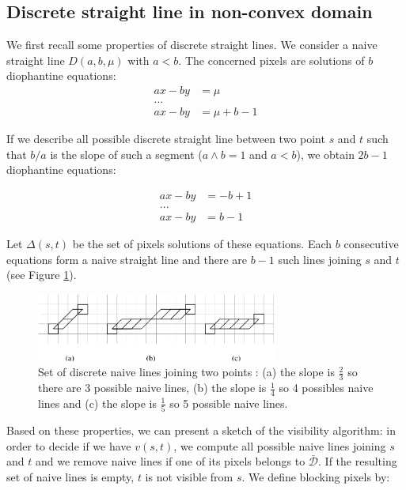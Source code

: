 \documentclass{llncs}
\begin{document}
\subsection{Discrete straight line in non-convex domain}

We first recall some properties of discrete straight lines. We consider a naive straight line
$D(a,b,\mu)$ with $a<b$. The concerned pixels are solutions of $b$ diophantine  equations:
\begin{align*}
ax-by&=\mu\\
...& \\
ax-by&=\mu+b-1
\end{align*}

If we describe all possible discrete straight line between two point $s$ and $t$ such that $b/a$ is
the slope of such a segment ($a\wedge b=1$ and $a<b$), we obtain $2b-1$ diophantine equations:

\begin{align*}
ax-by&=-b+1\\
...&\\
ax-by&=b-1
\end{align*}

Let $\Delta(s,t)$ be the set of pixels solutions of these equations. Each $b$ consecutive equations form a naive straight line and there are $b-1$ such lines joining $s$
and $t$ (see Figure \ref{fig:droites}).

\begin{figure}[htbp]
  \begin{center}
    \includegraphics[width=8cm]{droites}
    \caption{Set of discrete naive lines joining two points : (a) the slope is $\frac{2}{3}$ so
      there are 3 possible naive lines, (b) the slope is $\frac{1}{4}$ so 4 possibles naive lines
      and (c) the slope is $\frac{1}{5}$ so 5 possible naive lines.}
    \label{fig:droites}
  \end{center}
\end{figure}


Based on these properties, we can present a sketch of the visibility algorithm: in order to decide
if we have $v(s,t)$, we compute all possible naive lines joining $s$ and $t$ and we remove naive
lines if one of its pixels belongs to $\bar{\mathcal{D}}$. If the resulting set of naive lines is
empty, $t$ is not visible from $s$. We define blocking pixels by:
\end{document}

